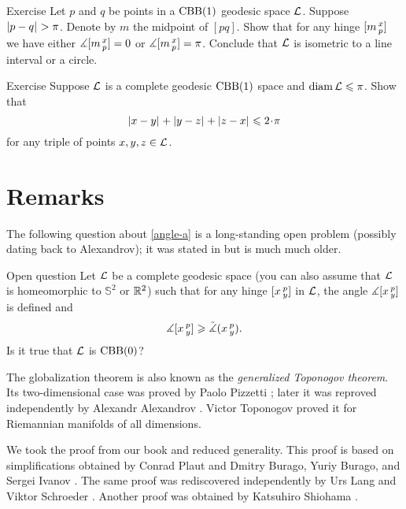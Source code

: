 \begin{thm}{Exercise}\label{ex:RisCBB(1)}
Let $p$ and $q$ be points in a $\mathrm{CBB}(1)$ geodesic space $\mathcal{L}$.
Suppose $\dist{p}{q}{}>\pi$.
Denote by $m$ the midpoint of $[pq]$.
Show that for any hinge $[m\,{}^{x}_{p}]$ we have
either $\measuredangle[m\,{}^{x}_{p}]=0$ or $\measuredangle[m\,{}^{x}_{p}]=\pi$.
Conclude that $\mathcal{L}$ is isometric to a line interval or a circle.

\end{thm}

\begin{thm}{Exercise}\label{ex:perim-k>0}
Suppose  
$\mathcal{L}$ is a complete geodesic $\mathrm{CBB}(1)$ space
and $\operatorname{\rm diam}\nolimits \mathcal{L}\leqslant \pi$.
Show that 
\[\dist{x}{y}{}+\dist{y}{z}{}+\dist{z}{x}{}\le 2\cdot\pi\]
for any triple of points $x,y,z\in \mathcal{L}$.
\end{thm}


\section{Remarks}

The following question about \ref{angle-a} is a long-standing open problem (possibly dating back to Alexandrov);
it was stated in \cite[footnote in 4.1.5]{burago-burago-ivanov} but is much much older.

\begin{thm}{Open question}\label{open:hinge-}
Let $\mathcal{L}$ be a complete geodesic space (you can also assume that $\mathcal{L}$ is homeomorphic to $\mathbb{S}^2$ or $\mathbb{R}^2$) 
such that for any hinge $[x\,{}^{p}_{y}]$ in $\mathcal{L}$, 
the angle $\measuredangle[x\,{}^{p}_{y}]$ is defined and 
\[\measuredangle[x\,{}^{p}_{y}]\geqslant\tilde\measuredangle(x\,{}^{p}_{y}).\]
Is it true that $\mathcal{L}$ is $\mathrm{CBB}(0)$?
\end{thm}

The globalization theorem is also known as the \textit{generalized Toponogov theorem}.
Its two-dimensional case was proved by Paolo Pizzetti \cite{pizzetti};
later it was reproved independently by Alexandr Alexandrov \cite{alexandrov:devel}. %
Victor Toponogov \cite{toponogov-globalization+splitting} proved it for Riemannian manifolds of all dimensions.

We took the proof from our book \cite{alexander-kapovitch-petrunin2024} and reduced generality.
This proof is based on simplifications obtained by Conrad Plaut \cite{plaut:dimension} and Dmitry Burago, Yuriy Burago, and Sergei Ivanov \cite{burago-burago-ivanov}.
The same proof was rediscovered independently by Urs Lang and Viktor Schroeder \cite{lang-schroeder:globalization}.
Another proof was obtained by
Katsuhiro Shiohama \cite{shiohama}.

